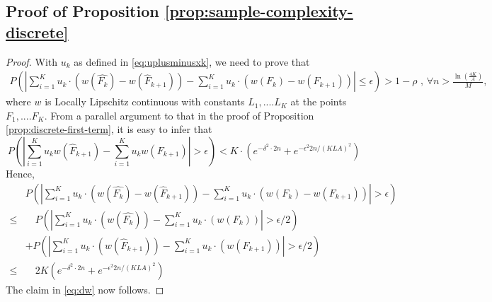 \subsection*{Proof of Proposition \ref{prop:sample-complexity-discrete}}
\begin{proof}
With $u_k$ as defined in \eqref{eq:uplusminusxk}, we need to prove that
\begin{align}
P(\left|\sum_{i=1}^K u_{k} \cdot(w(\hat{F_k})- w(\hat F_{k+1}) )
-  
\sum_{i=1}^K u_{k} \cdot(w(F_k)- w(F_{k+1}) )
\right| \leq \epsilon) > 1-\rho
\text{      ,     } \forall n> \frac{\ln(\frac{4K}{A})} { M}, 
\label{eq:dw}
\end{align}
where $w$ is Locally Lipschitz continuous with constants $L_1,....L_K$ at the points $F_1,....F_K$.
From a parallel argument to that in the proof of Proposition \ref{prop:discrete-first-term}, it is easy to infer that
$$P(\left| \sum_{i=1}^K u_k w(\hat F_{k+1}) - \sum_{i=1}^K u_k w(F_{k+1}) \right| >\epsilon) <
K\cdot ( e^{-\delta^2\cdot 2n} + e^{-\epsilon^2 2n/(KLA)^2})
$$
Hence,
\begin{align*}
& P(\left|\sum_{i=1}^K u_k \cdot(w(\hat{F_k})- w(\hat F_{k+1}) ) -  \sum_{i=1}^K u_k \cdot(w(F_k)-
w(F_{k+1}) ) \right| > \epsilon) \\ 
\leq & \quad P(\left|\sum_{i=1}^K u_k \cdot(w(\hat{F_k})) -
    \sum_{i=1}^K u_k \cdot(w(F_k)) \right| > \epsilon/2) \\
		&+ P(\left|\sum_{i=1}^K u_k
    \cdot(w(\hat F_{k+1})) -  \sum_{i=1}^K u_k \cdot(w(F_{k+1})) \right| > \epsilon/2) \\ \leq & \quad 2K
    (e^{-\delta^2\cdot 2n} + e^{-\epsilon^2 2n/(KLA)^2})
\end{align*}
The claim in \eqref{eq:dw} now follows.
\end{proof}

